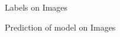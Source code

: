 \documentclass[12pt,a4paper]{article}
\begin{document}
\begin{figure}[htp]
    \centering
    \caption{Labels on Images}
    \label{fig:grpahLabels}
\end{figure}

\begin{figure}[h]
    \centering
    \caption{Prediction of model on Images}
    \label{fig:grpahPrediction}
\end{figure}
\end{document}
